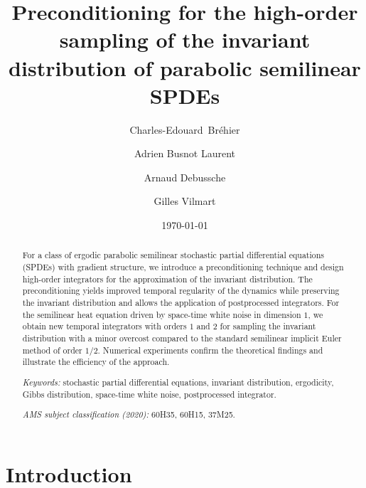 \documentclass[11pt]{amsart}
\begin{document}
\title{
Preconditioning for the high-order sampling of the invariant distribution of parabolic semilinear SPDEs
}

\author{Charles-Edouard~Br\'ehier}
\address{Universite de Pau et des Pays de l’Adour, E2S UPPA, CNRS, LMAP, Pau, France
}


\author{Adrien Busnot Laurent}
\address{Univ Rennes, INRIA (MINGuS), IRMAR - UMR 6625, ENS Rennes, France
}


\author{Arnaud Debussche}
\address{Univ Rennes, CNRS, IRMAR - UMR 6625, ENS Rennes, France
}


\author{Gilles Vilmart}
\address{Section of Mathematics, University of Geneva, Switzerland
}


\date{\today}

\begin{abstract}
For a class of ergodic parabolic semilinear stochastic partial differential equations (SPDEs) with gradient structure,
we introduce a preconditioning technique and design high-order integrators for the approximation of the invariant distribution.
The preconditioning yields improved temporal regularity of the dynamics while preserving the invariant distribution and allows the application of postprocessed integrators.
For the semilinear heat equation driven by space-time white noise in dimension $1$, we obtain new temporal integrators with orders $1$ and $2$ for sampling the invariant distribution with a minor overcost compared to the standard semilinear implicit Euler method of order $1/2$.
Numerical experiments confirm the theoretical findings and illustrate the efficiency of the approach.

\medskip

\noindent
\textit{Keywords:} stochastic partial differential equations, invariant distribution, ergodicity, Gibbs distribution, space-time white noise, postprocessed integrator.

\medskip

\noindent
\textit{AMS subject classification (2020):}
60H35, 60H15, 37M25.
\end{abstract}


\maketitle


\section{Introduction}
\end{document}
